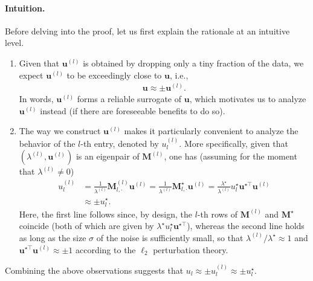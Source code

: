 \paragraph{Intuition.} Before delving into the proof, let us first explain the rationale at an intuitive level.
%
\begin{enumerate}
	\item Given that $\bm{u}^{(l)}$ is obtained by dropping only a tiny fraction of the data, we expect $\bm{u}^{(l)}$ to be exceedingly close to $\bm{u}$, i.e.,
	\begin{align}
		\bm{u} \approx \pm \bm{u}^{(l)}.
	\end{align}
	In words,  $\bm{u}^{(l)}$ forms a reliable surrogate of $\bm{u}$, which motivates us to analyze $\bm{u}^{(l)}$ instead (if there are foreseeable benefits to do so).


\item The way we construct $\bm{u}^{(l)}$ makes it particularly convenient to analyze the behavior of the $l$-th entry, denoted by $u_l^{(l)}$.
More specifically, given that $(\lambda^{(l)},\bm{u}^{(l)})$ is an eigenpair of $\bm{M}^{(l)}$, one has (assuming for the moment that $\lambda^{(l)} \neq 0$)
%
	\begin{align}
		u_{l}^{(l)} & =\frac{1}{\lambda^{(l)}}\bm{M}_{l,\cdot}^{(l)}\bm{u}^{(l)}=\frac{1}{\lambda^{(l)}}\bm{M}_{l,\cdot}^{\star}\bm{u}^{(l)}=\frac{\lambda^{\star}}{\lambda^{(l)}}u_{l}^{\star}\bm{u}^{\star\top}\bm{u}^{(l)}   \label{eq:ul_l-expression-denoising} \\
		& \approx \pm u_{l}^{\star}.
	\end{align}
	Here, the first line follows since, by design, the $l$-th rows of $\bm{M}^{(l)}$
		and $\bm{M}^{\star}$ coincide (both of which are given by $\lambda^{\star}u_{l}^{\star}\bm{u}^{\star\top}$), whereas the second line holds as long as the size $\sigma$ of the noise is sufficiently small, so that $ \lambda^{(l)} / \lambda^{\star} \approx 1$ and $\bm{u}^{\star\top}\bm{u}^{(l)}\approx \pm 1$ according to the $\ell_2$ perturbation theory.
	
	
\end{enumerate}
%
Combining the above observations suggests that $u_{l} \approx \pm u_{l}^{(l)} \approx \pm u_{l}^{\star}$.


